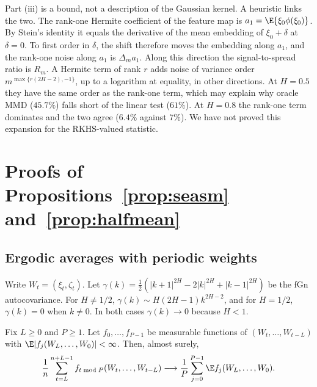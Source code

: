 Part (iii) is a bound, not a description of the Gaussian kernel. A heuristic links the two. The rank-one Hermite coefficient of the feature map is $a_1=\E\{\xi_0\phi(\xi_0)\}$. By Stein's identity it equals the derivative of the mean embedding of $\xi_0+\delta$ at $\delta=0$. To first order in $\delta$, the shift therefore moves the embedding along $a_1$, and the rank-one noise along $a_1$ is $\Delta_m a_1$. Along this direction the signal-to-spread ratio is $R_m$. A Hermite term of rank $r$ adds noise of variance order $m^{\max\{r(2H-2),-1\}}$, up to a logarithm at equality, in other directions. At $H=0.5$ they have the same order as the rank-one term, which may explain why oracle MMD ($45.7\%$) falls short of the linear test ($61\%$). At $H=0.8$ the rank-one term dominates and the two agree ($6.4\%$ against $7\%$). We have not proved this expansion for the RKHS-valued statistic.


\section{Proofs of Propositions~\ref{prop:seasm} and~\ref{prop:halfmean}}\label{sec:proofs}

\subsection{Ergodic averages with periodic weights}
Write $W_t=(\xi_t,\zeta_t)$. Let $\gamma(k)=\tfrac12(|k+1|^{2H}-2|k|^{2H}+|k-1|^{2H})$ be the fGn autocovariance. For $H\ne1/2$, $\gamma(k)\sim H(2H-1)k^{2H-2}$, and for $H=1/2$, $\gamma(k)=0$ when $k\ne0$. In both cases $\gamma(k)\to0$ because $H<1$.

\begin{lemma}\label{lem:ergodic}
Fix $L\ge0$ and $P\ge1$. Let $f_0,\ldots,f_{P-1}$ be measurable functions of $(W_t,\ldots,W_{t-L})$ with $\E|f_j(W_L,\ldots,W_0)|<\infty$. Then, almost surely,
\[
\frac1n\sum_{t=L}^{n+L-1}f_{t\bmod P}(W_t,\ldots,W_{t-L})\longrightarrow\frac1P\sum_{j=0}^{P-1}\E f_j(W_L,\ldots,W_0).
\]
\end{lemma}

